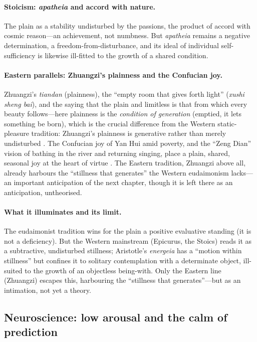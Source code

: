\paragraph{Stoicism: \emph{apatheia} and accord with nature.} The plain as a stability undisturbed by the passions, the product of accord with cosmic reason---an achievement, not numbness. But \emph{apatheia} remains a negative determination, a freedom-from-disturbance, and its ideal of individual self-sufficiency is likewise ill-fitted to the growth of a shared condition.

\paragraph{Eastern parallels: Zhuangzi's plainness and the Confucian joy.} Zhuangzi's \emph{tiandan} (plainness), the ``empty room that gives forth light'' (\emph{xushi sheng bai}), and the saying that the plain and limitless is that from which every beauty follows---here plainness is the \emph{condition of generation} (emptied, it lets something be born), which is the crucial difference from the Western static-pleasure tradition: Zhuangzi's plainness is generative rather than merely undisturbed \parencite{zhuangzi2009}. The Confucian joy of Yan Hui amid poverty, and the ``Zeng Dian'' vision of bathing in the river and returning singing, place a plain, shared, seasonal joy at the heart of virtue \parencite{confucius1998}. The Eastern tradition, Zhuangzi above all, already harbours the ``stillness that generates'' the Western eudaimonism lacks---an important anticipation of the next chapter, though it is left there as an anticipation, untheorised.

\paragraph{What it illuminates and its limit.} The eudaimonist tradition wins for the plain a positive evaluative standing (it is not a deficiency). But the Western mainstream (Epicurus, the Stoics) reads it as a subtractive, undisturbed stillness; Aristotle's \emph{energeia} has a ``motion within stillness'' but confines it to solitary contemplation with a determinate object, ill-suited to the growth of an objectless being-with. Only the Eastern line (Zhuangzi) escapes this, harbouring the ``stillness that generates''---but as an intimation, not yet a theory.

\subsection{Neuroscience: low arousal and the calm of prediction}
\label{p19:sub:theories-neuro}

